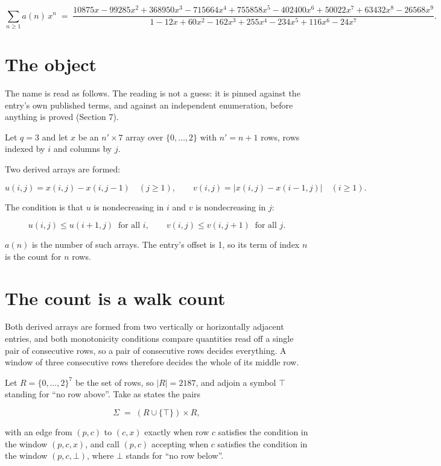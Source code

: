 \documentclass[11pt]{article}
\theoremstyle{definition}
\begin{document}
\[\sum_{n \ge 1} a(n)\,x^n \;=\; \frac{10875x - 99285x^{2} + 368950x^{3} - 715664x^{4} + 755858x^{5} - 402400x^{6} + 50022x^{7} + 63432x^{8} - 26568x^{9}}{1 - 12x + 60x^{2} - 162x^{3} + 255x^{4} - 234x^{5} + 116x^{6} - 24x^{7}}.\]

\section{The object}

The name is read as follows. The reading is not a guess: it is pinned against the entry's own published terms, and against an independent enumeration, before anything is proved (Section 7).

Let $q = 3$ and let $x$ be an $n' \times 7$ array over $\{0,\dots,2\}$ with $n' = n + 1$ rows, rows indexed by $i$ and columns by $j$.

Two derived arrays are formed:

\[u(i,j) = x(i,j) - x(i,j{-}1)\quad (j \ge 1), \qquad v(i,j) = \lvert x(i,j) - x(i{-}1,j)\rvert\quad (i \ge 1).\]

The condition is that $u$ is nondecreasing in $i$ and $v$ is nondecreasing in $j$:

\[u(i,j) \le u(i{+}1,j) \ \text{ for all } i, \qquad v(i,j) \le v(i,j{+}1) \ \text{ for all } j.\]

$a(n)$ is the number of such arrays. The entry's offset is 1, so its term of index $n$ is the count for $n$ rows.

\section{The count is a walk count}

Both derived arrays are formed from two vertically or horizontally adjacent entries, and both monotonicity conditions compare quantities read off a single pair of consecutive rows, so a pair of consecutive rows decides everything. A window of three consecutive rows therefore decides the whole of its middle row.

Let $R = \{0,\dots,2\}^{7}$ be the set of rows, so $|R| = 2187$, and adjoin a symbol $\top$ standing for ``no row above''. Take as states the pairs

\[\Sigma \;=\; (R \cup \{\top\}) \times R,\]

with an edge from $(p,c)$ to $(c,x)$ exactly when row $c$ satisfies the condition in the window $(p,c,x)$, and call $(p,c)$ accepting when $c$ satisfies the condition in the window $(p,c,\bot)$, where $\bot$ stands for ``no row below''.
\end{document}
